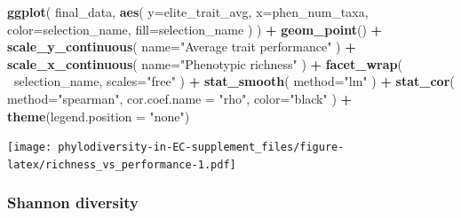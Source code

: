 \documentclass[]{book}
\newenvironment{Shaded}{\begin{snugshade}}{\end{snugshade}}
\newcommand{\DataTypeTok}[1]{\textcolor[rgb]{0.13,0.29,0.53}{#1}}
\newcommand{\KeywordTok}[1]{\textcolor[rgb]{0.13,0.29,0.53}{\textbf{#1}}}
\newcommand{\NormalTok}[1]{#1}
\newcommand{\OperatorTok}[1]{\textcolor[rgb]{0.81,0.36,0.00}{\textbf{#1}}}
\newcommand{\StringTok}[1]{\textcolor[rgb]{0.31,0.60,0.02}{#1}}
\begin{document}
\begin{Shaded}
\begin{Highlighting}[]
\KeywordTok{ggplot}\NormalTok{(}
\NormalTok{    final_data,}
    \KeywordTok{aes}\NormalTok{(}
        \DataTypeTok{y=}\NormalTok{elite_trait_avg,}
        \DataTypeTok{x=}\NormalTok{phen_num_taxa,}
        \DataTypeTok{color=}\NormalTok{selection_name,}
        \DataTypeTok{fill=}\NormalTok{selection_name}
\NormalTok{    )}
\NormalTok{  ) }\OperatorTok{+}
\StringTok{  }\KeywordTok{geom_point}\NormalTok{() }\OperatorTok{+}
\StringTok{    }\KeywordTok{scale_y_continuous}\NormalTok{(}
        \DataTypeTok{name=}\StringTok{"Average trait performance"}
\NormalTok{  ) }\OperatorTok{+}
\StringTok{  }\KeywordTok{scale_x_continuous}\NormalTok{(}
        \DataTypeTok{name=}\StringTok{"Phenotypic richness"}
\NormalTok{  ) }\OperatorTok{+}\StringTok{ }
\StringTok{  }\KeywordTok{facet_wrap}\NormalTok{(}
      \OperatorTok{~}\NormalTok{selection_name, }\DataTypeTok{scales=}\StringTok{"free"}
\NormalTok{  ) }\OperatorTok{+}\StringTok{ }
\StringTok{  }\KeywordTok{stat_smooth}\NormalTok{(}
    \DataTypeTok{method=}\StringTok{"lm"}
\NormalTok{  ) }\OperatorTok{+}\StringTok{ }
\StringTok{  }\KeywordTok{stat_cor}\NormalTok{(}
    \DataTypeTok{method=}\StringTok{"spearman"}\NormalTok{, }\DataTypeTok{cor.coef.name =} \StringTok{"rho"}\NormalTok{, }\DataTypeTok{color=}\StringTok{"black"}
\NormalTok{  ) }\OperatorTok{+}
\StringTok{  }\KeywordTok{theme}\NormalTok{(}\DataTypeTok{legend.position =} \StringTok{"none"}\NormalTok{)}
\end{Highlighting}
\end{Shaded}

\texttt{[image: phylodiversity-in-EC-supplement\_files/figure-latex/richness\_vs\_performance-1.pdf]}

\hypertarget{shannon-diversity-4}{%
\subsubsection{Shannon diversity}\label{shannon-diversity-4}}
\end{document}
